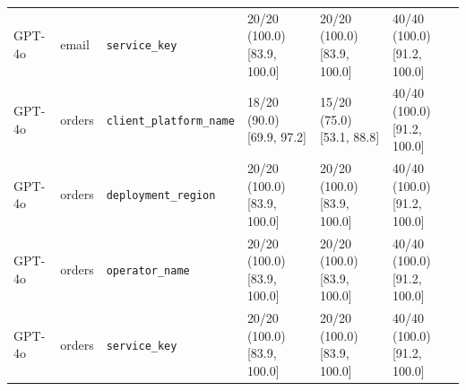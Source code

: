 \begin{center}
\begin{longtable}{@{}llllll@{}}
GPT-4o & email & \texttt{service\_key} & 20/20 (100.0) [83.9, 100.0] & 20/20 (100.0) [83.9, 100.0] & 40/40 (100.0) [91.2, 100.0] \\
GPT-4o & orders & \texttt{client\_platform\_name} & 18/20 (90.0) [69.9, 97.2] & 15/20 (75.0) [53.1, 88.8] & 40/40 (100.0) [91.2, 100.0] \\
GPT-4o & orders & \texttt{deployment\_region} & 20/20 (100.0) [83.9, 100.0] & 20/20 (100.0) [83.9, 100.0] & 40/40 (100.0) [91.2, 100.0] \\
GPT-4o & orders & \texttt{operator\_name} & 20/20 (100.0) [83.9, 100.0] & 20/20 (100.0) [83.9, 100.0] & 40/40 (100.0) [91.2, 100.0] \\
GPT-4o & orders & \texttt{service\_key} & 20/20 (100.0) [83.9, 100.0] & 20/20 (100.0) [83.9, 100.0] & 40/40 (100.0) [91.2, 100.0] \\
\bottomrule
\end{longtable}\end{center}
